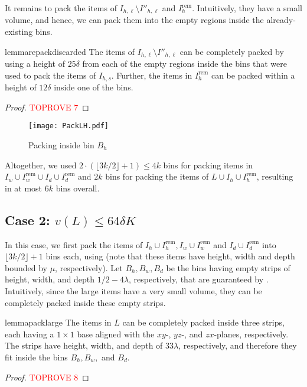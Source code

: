 \documentclass[a4paper,UKenglish,cleveref, autoref, thm-restate]{lipics-v2021}
\renewcommand{\epsilon}{\lambda}
\begin{document}
It remains to pack the items of $I_{h,\ell}\setminus I''_{h,\ell}$ and $I^{\text{rem}}_h$. Intuitively, they have a small volume, and hence, we can pack them into the empty regions inside the already-existing bins.

\begin{restatable}{lemma}{repackdiscarded}
\label{lem:repackdiscarded}
    The items of $I_{h,\ell}\setminus I''_{h,\ell}$ can be completely packed by using a height of $25\delta$ from each of the empty regions inside the bins that were used to pack the items of $I_{h,s}$. Further, the items in $I^{\text{rem}}_h$ can be packed within a height of $12\delta$ inside one of the bins.
\end{restatable}
\begin{proof}\textcolor{red}{TOPROVE 7}\end{proof}

\begin{figure}
    \centering
    \texttt{[image: PackLH.pdf]}
    \caption{Packing inside bin $B_h$}
    \label{fig:Planes cutting}
\end{figure}



Altogether, we used $2\cdot (\lfloor 3k/2\rfloor +1)\le 4k$ bins for packing items in $I_w \cup I^{\text{rem}}_w \cup I_d \cup I^{\text{rem}}_d$ and $2k$ bins for packing the items of $L\cup I_h \cup I^{\text{rem}}_h$, resulting in at most $6k$ bins overall.

\subsection{Case 2: \texorpdfstring{$v(L)\le 64\delta K$}{small volume for L}}
\label{sec:largehassmallvol}

In this case, we first pack the items of $I_h\cup I^{\text{rem}}_h, I_w \cup I^{\text{rem}}_w$ and $I_d \cup I^{\text{rem}}_d$ into $\lfloor 3k/2 \rfloor + 1$ bins each, using  (note that these items have height, width and depth bounded by $\mu$, respectively). Let $B_h, B_w, B_d$ be the bins having empty strips of height, width, and depth $1/2-4\epsilon$, respectively, that are guaranteed by . Intuitively, since the large items have a very small volume, they can be completely packed inside these empty strips.

\begin{restatable}{lemma}{packlarge}
\label{lem:packlarge}
    The items in $L$ can be completely packed inside three strips, each having a $1\times 1$ base aligned with the $xy$-, $yz$-, and $zx$-planes, respectively. The strips have height, width, and depth of $33\epsilon$, respectively, and therefore they fit inside the bins $B_h, B_w,$ and $B_d$.
\end{restatable}
\begin{proof}\textcolor{red}{TOPROVE 8}\end{proof}
\end{document}
